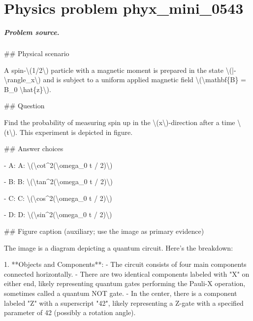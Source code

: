 
\chapter{Physics problem phyx\_mini\_0543}
\label{ch:PhyXMiniProblems_problem_phyx_mini_0543}

\paragraph{Problem source.}
\#\# Physical scenario

A spin-\textbackslash{}(1/2\textbackslash{}) particle with a magnetic moment is prepared in the state \textbackslash{}(|-\textbackslash{}rangle\_x\textbackslash{}) and is subject to a uniform applied magnetic field \textbackslash{}(\textbackslash{}mathbf\{B\} = B\_0 \textbackslash{}hat\{z\}\textbackslash{}).

\#\# Question

Find the probability of measuring spin up in the \textbackslash{}(x\textbackslash{})-direction after a time \textbackslash{}(t\textbackslash{}). This experiment is depicted in figure.

\#\# Answer choices

- A: A: \textbackslash{}(\textbackslash{}cot\textasciicircum{}2(\textbackslash{}omega\_0 t / 2)\textbackslash{})

- B: B: \textbackslash{}(\textbackslash{}tan\textasciicircum{}2(\textbackslash{}omega\_0 t / 2)\textbackslash{})

- C: C: \textbackslash{}(\textbackslash{}cos\textasciicircum{}2(\textbackslash{}omega\_0 t / 2)\textbackslash{})

- D: D: \textbackslash{}(\textbackslash{}sin\textasciicircum{}2(\textbackslash{}omega\_0 t / 2)\textbackslash{})

\#\# Figure caption (auxiliary; use the image as primary evidence)

The image is a diagram depicting a quantum circuit. Here's the breakdown:

1. **Objects and Components**:
   - The circuit consists of four main components connected horizontally.
   - There are two identical components labeled with "X" on either end, likely representing quantum gates performing the Pauli-X operation, sometimes called a quantum NOT gate.
   - In the center, there is a component labeled "Z" with a superscript "42", likely representing a Z-gate with a specified parameter of 42 (possibly a rotation angle).

